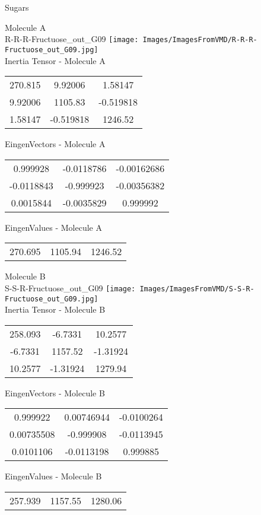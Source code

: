 \vtab[-2cm]
\begin{center}
{\large Sugars}
\end{center}
\begin{multicols}{2}
\begin{center}
Molecule A \\ 
R-R-R-Fructuose\_out\_G09
\texttt{[image: Images/ImagesFromVMD/R-R-R-Fructuose\_out\_G09.jpg]}
\\
Inertia Tensor - Molecule A \\
\vtab
\begin{tabular}{|c c c|}
270.815	 & 	9.92006	 & 	1.58147	 \\
9.92006	 & 	1105.83	 & 	-0.519818	 \\
1.58147	 & 	-0.519818	 & 	1246.52
\end{tabular}

\vtab
 EingenVectors - Molecule A     \\
\vtab
\begin{tabular}{|c c c|}
0.999928	 & 	-0.0118786	 & 	-0.00162686	 \\
-0.0118843	 & 	-0.999923	 & 	-0.00356382	 \\
0.0015844	 & 	-0.0035829	 & 	0.999992
\end{tabular}

\vtab
 EingenValues - Molecule A     \\
\vtab
\begin{tabular}{|c c c|}
270.695	 & 	1105.94	 & 	1246.52
\end{tabular}
\columnbreak

Molecule B \\ 
S-S-R-Fructuose\_out\_G09
\texttt{[image: Images/ImagesFromVMD/S-S-R-Fructuose\_out\_G09.jpg]}
\\
Inertia Tensor - Molecule B \\
\vtab
\begin{tabular}{|c c c|}
258.093	 & 	-6.7331	 & 	10.2577	 \\
-6.7331	 & 	1157.52	 & 	-1.31924	 \\
10.2577	 & 	-1.31924	 & 	1279.94
\end{tabular}

\vtab
 EingenVectors - Molecule B     \\
\vtab
\begin{tabular}{|c c c|}
0.999922	 & 	0.00746944	 & 	-0.0100264	 \\
0.00735508	 & 	-0.999908	 & 	-0.0113945	 \\
0.0101106	 & 	-0.0113198	 & 	0.999885
\end{tabular}

\vtab
 EingenValues - Molecule B     \\
\vtab
\begin{tabular}{|c c c|}
257.939	 & 	1157.55	 & 	1280.06
\end{tabular}

\end{center}
\end{multicols}
